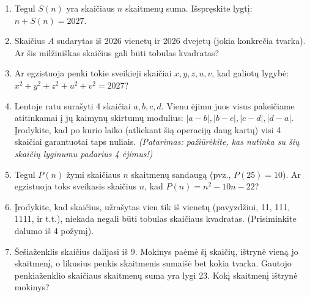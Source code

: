 \documentclass[11pt,a4paper]{scrartcl}
\begin{document}
\begin{enumerate}
    \item Tegul $S(n)$ yra skaičiaus $n$ skaitmenų suma. Išspręskite lygtį: $n + S(n) = 2027$.
    \item Skaičius $A$ sudarytas iš 2026 vienetų ir 2026 dvejetų (jokia konkrečia tvarka). Ar šis milžiniškas skaičius gali būti tobulas kvadratas?
    \item Ar egzistuoja penki tokie sveikieji skaičiai $x, y, z, u, v$, kad galiotų lygybė: $x^2 + y^2 + z^2 + u^2 + v^2 = 2027$?
    \item Lentoje ratu surašyti 4 skaičiai $a, b, c, d$. Vienu ėjimu juos visus pakeičiame atitinkamai į jų kaimynų skirtumų modulius: $|a-b|, |b-c|, |c-d|, |d-a|$. Įrodykite, kad po kurio laiko (atliekant šią operaciją daug kartų) visi 4 skaičiai garantuotai taps nuliais. \textit{(Patarimas: pažiūrėkite, kas nutinka su šių skaičių lyginumu padarius 4 ėjimus!)}
    \item Tegul $P(n)$ žymi skaičiaus $n$ skaitmenų sandaugą (pvz., $P(25) = 10$). Ar egzistuoja toks sveikasis skaičius $n$, kad $P(n) = n^2 - 10n - 22$?
    \item Įrodykite, kad skaičius, užrašytas vien tik iš vienetų (pavyzdžiui, 11, 111, 1111, ir t.t.), niekada negali būti tobulas skaičiaus kvadratas. (Prisiminkite dalumo iš 4 požymį).
    \item Šešiaženklis skaičius dalijasi iš 9. Mokinys paėmė šį skaičių, ištrynė vieną jo skaitmenį, o likusius penkis skaitmenis sumaišė bet kokia tvarka. Gautojo penkiaženklio skaičiaus skaitmenų suma yra lygi 23. Kokį skaitmenį ištrynė mokinys?
\end{enumerate}
\end{document}
